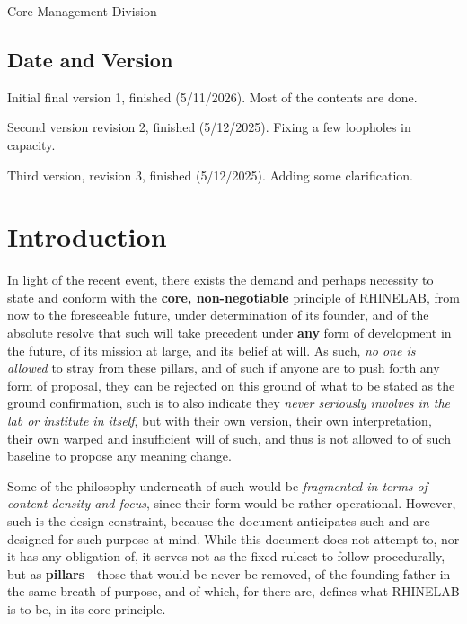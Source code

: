 \documentclass[10pt,a4paper]{article}
\begin{document}
Core Management Division

\subsection{Date and Version}


Initial final version 1, finished (5/11/2026). Most of the contents are done. 

Second version revision 2, finished (5/12/2025). Fixing a few loopholes in capacity. 

Third version, revision 3, finished (5/12/2025). Adding some clarification. 

\section{Introduction}

In light of the recent event, there exists the demand and perhaps necessity to state and conform with the \textbf{core, non-negotiable} principle of RHINELAB, from now to the foreseeable future, under determination of its founder, and of the absolute resolve that such will take precedent under \textbf{any} form of development in the future, of its mission at large, and its belief at will. As such, \textit{no one is allowed} to stray from these pillars, and of such if anyone are to push forth any form of proposal, they can be rejected on this ground of what to be stated as the ground confirmation, such is to also indicate they \textit{never seriously involves in the lab or institute in itself}, but with their own version, their own interpretation, their own warped and insufficient will of such, and thus is not allowed to of such baseline to propose any meaning change.

Some of the philosophy underneath of such would be \textit{fragmented in terms of content density and focus}, since their form would be rather operational. However, such is the design constraint, because the document anticipates such and are designed for such purpose at mind. While this document does not attempt to, nor it has any obligation of, it serves not as the fixed ruleset to follow procedurally, but as \textbf{pillars} - those that would be never be removed, of the founding father in the same breath of purpose, and of which, for there are, defines what RHINELAB is to be, in its core principle. 
\end{document}
